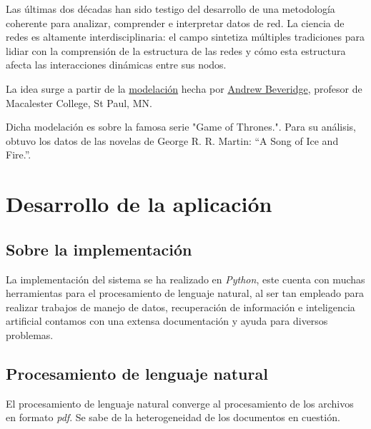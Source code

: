 \documentclass[a4paper,10pt,twocolumn]{article}
\begin{document}
  Las últimas dos décadas han sido testigo del desarrollo de una metodología coherente para analizar, comprender e interpretar datos de red. La ciencia de redes es altamente interdisciplinaria: el campo sintetiza múltiples tradiciones para lidiar con la comprensión de la estructura de las redes y cómo esta estructura afecta las interacciones dinámicas entre sus nodos.
  
  La idea surge a partir de la \href{https://networkofthrones.wordpress.com/}{modelación} hecha por \href{https://mathbeveridge.github.io/index.html}{Andrew Beveridge}, profesor de Macalester College, St Paul, MN. 
  
  Dicha modelación es sobre la famosa serie "Game of Thrones.". Para su análisis, obtuvo los datos de las novelas de George R. R. Martin: “A Song of Ice and Fire.”. 



\section{Desarrollo de la aplicación}\label{sec:dev}
        \subsection{Sobre la implementación}\label{sub:results}

        La implementación del sistema se ha realizado en \emph{Python}, este cuenta con muchas herramientas para el procesamiento de lenguaje natural, al ser tan empleado para realizar trabajos de manejo de datos, recuperación de información e inteligencia artificial contamos con una extensa documentación y ayuda para diversos problemas.

	\subsection{Procesamiento de lenguaje natural}\label{sub:results}
        El procesamiento de lenguaje natural converge al procesamiento de los archivos en formato \emph{pdf}. Se sabe de la heterogeneidad de los documentos en cuestión.
        
\end{document}
